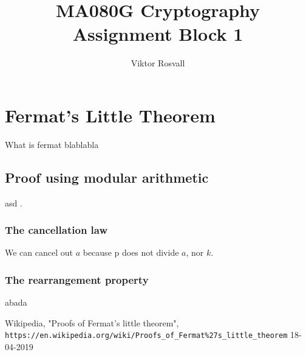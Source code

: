 \documentclass{article}
\title{MA080G Cryptography Assignment Block 1}
\author{Viktor Rosvall}
\begin{document}
	\maketitle
	
	\section*{Fermat's Little Theorem}
	What is fermat blablabla
	
 	\subsection*{Proof using modular arithmetic}
 	asd \cite{fermatproof}. 
 	
 	
 	\subsubsection*{The cancellation law}
 	We can cancel out $a$ because p does not divide $a$, nor $k$.
 	
 	\subsubsection*{The rearrangement property}
 	abada

	\medskip

	\begin{thebibliography}{99}
		
		Wikipedia, "Proofs of Fermat's little theorem",
		\\\texttt{https://en.wikipedia.org/wiki/Proofs\_of\_Fermat\%27s\_little\_theorem} 18-04-2019
		
	\end{thebibliography}
\end{document}
